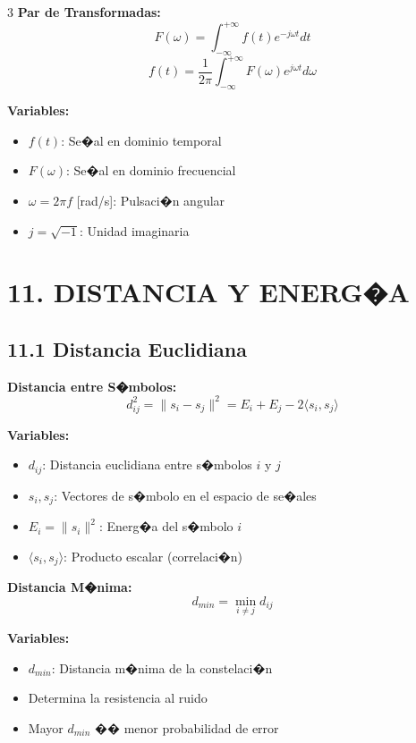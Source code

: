 ﻿\documentclass[8pt,a4paper]{article}
\begin{document}
\begin{multicols}{3}
\textbf{Par de Transformadas:}
\[
F(\omega) = \int_{-\infty}^{+\infty} f(t) e^{-j\omega t} dt
\]
\[
f(t) = \frac{1}{2\pi} \int_{-\infty}^{+\infty} F(\omega) e^{j\omega t} d\omega
\]

\textbf{Variables:}
\begin{itemize}[leftmargin=*,itemsep=0pt]
    \item $f(t)$: Se�al en dominio temporal
    \item $F(\omega)$: Se�al en dominio frecuencial
    \item $\omega = 2\pi f$ [rad/s]: Pulsaci�n angular
    \item $j = \sqrt{-1}$: Unidad imaginaria
\end{itemize}

\vspace{-2mm}
\section*{\color{sectioncolor}\normalsize 11. DISTANCIA Y ENERG�A}
\vspace{-3mm}

\subsection*{\small 11.1 Distancia Euclidiana}
\vspace{-2mm}

\textbf{Distancia entre S�mbolos:}
\[
d_{ij}^2 = \|s_i - s_j\|^2 = E_i + E_j - 2\langle s_i, s_j \rangle
\]

\textbf{Variables:}
\begin{itemize}[leftmargin=*,itemsep=0pt]
    \item $d_{ij}$: Distancia euclidiana entre s�mbolos $i$ y $j$
    \item $s_i, s_j$: Vectores de s�mbolo en el espacio de se�ales
    \item $E_i = \|s_i\|^2$: Energ�a del s�mbolo $i$
    \item $\langle s_i, s_j \rangle$: Producto escalar (correlaci�n)
\end{itemize}

\textbf{Distancia M�nima:}
\[
d_{min} = \min_{i \neq j} d_{ij}
\]

\textbf{Variables:}
\begin{itemize}[leftmargin=*,itemsep=0pt]
    \item $d_{min}$: Distancia m�nima de la constelaci�n
    \item Determina la resistencia al ruido
    \item Mayor $d_{min}$ �� menor probabilidad de error
\end{itemize}


\end{multicols}
\end{document}
